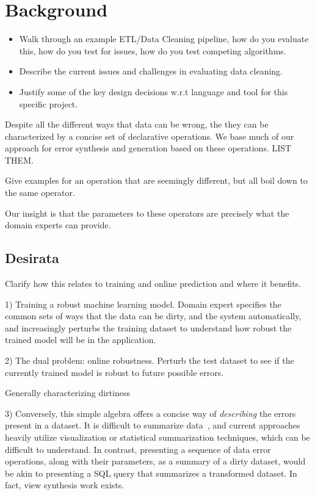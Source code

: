 \section{Background}

\begin{itemize}
    \item Walk through an example ETL/Data Cleaning pipeline, how do you evaluate this, how do you test for issues, how do you test competing algorithms.
    \item Describe the current issues and challenges in evaluating data cleaning.
    \item Justify some of the key design decisions w.r.t language and tool for this specific project.
\end{itemize}

Despite all the different ways that data can be wrong, the they can be characterized by a concise set of declarative operations.  We base much of our approach for error synthesis and generation based on these operations.  LIST THEM.

Give examples for an operation that are seemingly different, but all boil down to the same operator.

Our insight is that the parameters to these operators are precisely what the domain experts can provide.

\subsection{Desirata}

Clarify how this relates to training and online prediction and where it benefits.  

1) Training a robust machine learning model.  Domain expert specifies the common sets of ways that the data can be dirty, and the system automatically, and increasingly perturbs the training dataset to understand how robust the trained model will be in the application.

2) The dual problem: online robustness.  Perturb the test dataset to see if the currently trained model is robust to future possible errors.

Generally characterizing dirtiness

3) Conversely, this simple algebra offers a concise way of {\it describing} the errors present in a dataset.  It is difficult to summarize data~\cite{bhardwaj2015collaborative}, and current approaches heavily utilize visualization or statistical summarization techniques, which can be difficult to understand.  In contrast, presenting a sequence of data error operations, along with their parameters, as a summary of a dirty dataset, would be akin to presenting a SQL query that summarizes a transformed dataset.  In fact, view synthesis work exists.




